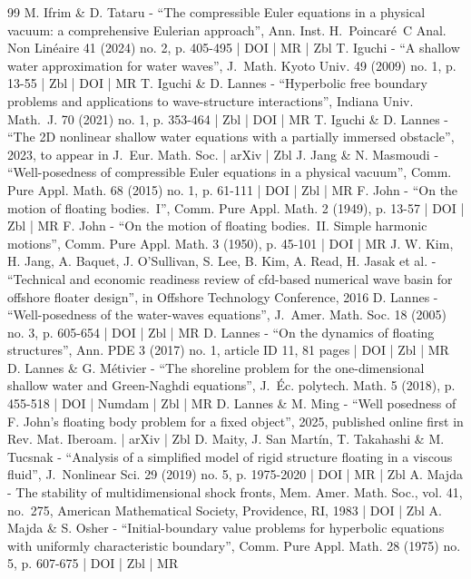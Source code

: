 \begin{thebibliography}{99}
M. Ifrim \& D. Tataru - “The compressible Euler equations in a physical vacuum: a comprehensive Eulerian approach”, Ann. Inst. H. Poincaré C Anal. Non Linéaire 41 (2024) no. 2, p. 405-495 | DOI | MR | Zbl
T. Iguchi - “A shallow water approximation for water waves”, J. Math. Kyoto Univ. 49 (2009) no. 1, p. 13-55 | Zbl | DOI | MR
T. Iguchi \& D. Lannes - “Hyperbolic free boundary problems and applications to wave-structure interactions”, Indiana Univ. Math. J. 70 (2021) no. 1, p. 353-464 | Zbl | DOI | MR
T. Iguchi \& D. Lannes - “The 2D nonlinear shallow water equations with a partially immersed obstacle”, 2023, to appear in J. Eur. Math. Soc. | arXiv | Zbl
J. Jang \& N. Masmoudi - “Well-posedness of compressible Euler equations in a physical vacuum”, Comm. Pure Appl. Math. 68 (2015) no. 1, p. 61-111 | DOI | Zbl | MR
F. John - “On the motion of floating bodies. I”, Comm. Pure Appl. Math. 2 (1949), p. 13-57 | DOI | Zbl | MR
F. John - “On the motion of floating bodies. II. Simple harmonic motions”, Comm. Pure Appl. Math. 3 (1950), p. 45-101 | DOI | MR
J. W. Kim, H. Jang, A. Baquet, J. O’Sullivan, S. Lee, B. Kim, A. Read, H. Jasak et al. - “Technical and economic readiness review of cfd-based numerical wave basin for offshore floater design”, in Offshore Technology Conference, 2016
D. Lannes - “Well-posedness of the water-waves equations”, J. Amer. Math. Soc. 18 (2005) no. 3, p. 605-654 | DOI | Zbl | MR
D. Lannes - “On the dynamics of floating structures”, Ann. PDE 3 (2017) no. 1, article ID 11, 81 pages | DOI | Zbl | MR
D. Lannes \& G. Métivier - “The shoreline problem for the one-dimensional shallow water and Green-Naghdi equations”, J. Éc. polytech. Math. 5 (2018), p. 455-518 | DOI | Numdam | Zbl | MR
D. Lannes \& M. Ming - “Well posedness of F. John’s floating body problem for a fixed object”, 2025, published online first in Rev. Mat. Iberoam. | arXiv | Zbl
D. Maity, J. San Martín, T. Takahashi \& M. Tucsnak - “Analysis of a simplified model of rigid structure floating in a viscous fluid”, J. Nonlinear Sci. 29 (2019) no. 5, p. 1975-2020 | DOI | MR | Zbl
A. Majda - The stability of multidimensional shock fronts, Mem. Amer. Math. Soc., vol. 41, no. 275, American Mathematical Society, Providence, RI, 1983 | DOI | Zbl
A. Majda \& S. Osher - “Initial-boundary value problems for hyperbolic equations with uniformly characteristic boundary”, Comm. Pure Appl. Math. 28 (1975) no. 5, p. 607-675 | DOI | Zbl | MR

\end{thebibliography}
